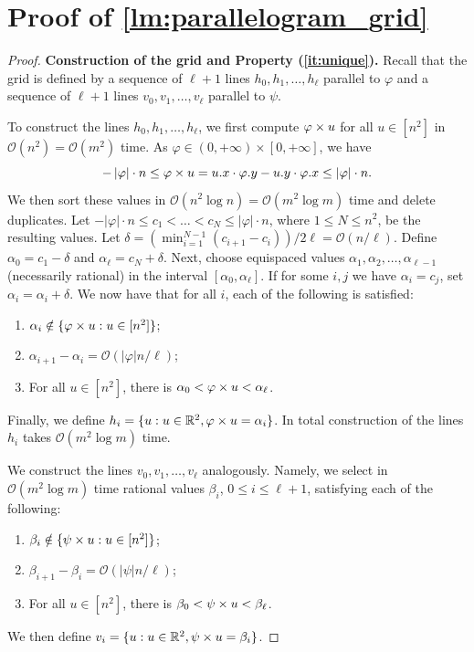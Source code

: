 \documentclass[a4paper,11pt]{article}
\newcommand{\R}{\mathbb{R}}
\renewcommand{\O}{\mathcal{O}}
\renewcommand{\phi}{\varphi}
\newcommand{\absolute}[1]{\left\lvert#1\right\rvert}
\begin{document}


\appendix
\section[Constructing a parallelogram grid]{Proof of \cref{lm:parallelogram_grid}}
\label{app:parallelogram_grid}

\restateLemParallelogramGrid*

\begin{proof}
\def\paragraphrp#1{\vspace{.5\baselineskip}

\noindent\textbf{#1}}

\paragraphrp{Construction of the grid and Property (\ref{it:unique}).}
Recall that the grid is defined by a sequence of $\ell+1$ lines $h_0, h_1, \ldots, h_\ell$ parallel to $\phi$ and a sequence of $\ell+1$ lines $v_0, v_1, \ldots, v_\ell$ parallel to $\psi$. 

To construct the lines $h_0, h_1, \ldots, h_\ell$, we first compute $\h{u}$ for all $u \in [n^2]$ in $\O(n^2) = \O(m^2)$ time. As $\phi \in (0,+\infty) \times [0,+\infty]$, we have 
$$-\absolute{\phi} \cdot n \le \h{u} = \x{u} \cdot \y{\phi} - \y{u} \cdot \x{\phi} \le \absolute{\phi} \cdot n.$$
We then sort these values in $\O(n^2 \log n) = \O(m^2 \log m)$ time and delete duplicates. Let $-\absolute{\phi} \cdot n \le c_1 < \ldots < c_{N} \le \absolute{\phi} \cdot n$, where $1 \le N \le n^2$, be the resulting values. Let $\delta = (\min_{i=1}^{N-1} (c_{i+1}-c_i))/2\ell = \O(n/\ell)$. Define $\alpha_0 = c_1 -\delta$ and $\alpha_\ell = c_{N} + \delta$. Next, choose equispaced values $\alpha_1, \alpha_2, \ldots, \alpha_{\ell-1}$ (necessarily rational) in the interval $[\alpha_0, \alpha_{\ell}]$. If for some $i, j$ we have $\alpha_i = c_j$, set $\alpha_i = \alpha_i + \delta$. We now have that for all $i$, each of the following is satisfied:
\begin{enumerate}
\item $\alpha_i \notin \{\h{u} : u \in [n^2]\}$;
\item $\alpha_{i+1}-\alpha_i = \O(\absolute{\phi} n / \ell)$;
\item For all $u \in [n^2]$, there is $\alpha_0 < \h{u} < \alpha_\ell$.
\end{enumerate}
Finally, we define $h_i = \{u: u \in \R^2, \h{u} = \alpha_i\}$. In total construction of the lines $h_i$ takes $\O(m^2 \log m)$ time.

We construct the lines $v_0, v_1, \ldots, v_\ell$ analogously. Namely, we select in $\O(m^2 \log m)$ time rational values $\beta_i$, $0 \le i \le \ell+1$, satisfying each of the following:
\begin{enumerate}
\item $\beta_i \notin \{\psi \times u : u \in [n^2]\}$;
\item $\beta_{i+1}-\beta_i = \O(\absolute{\psi} n / \ell)$;
\item For all $u \in [n^2]$, there is $\beta_0 < \psi \times u < \beta_\ell$.
\end{enumerate}
We then define $v_i = \{u: u \in \R^2, \s{u} = \beta_i\}$. 


\end{proof}
\end{document}
